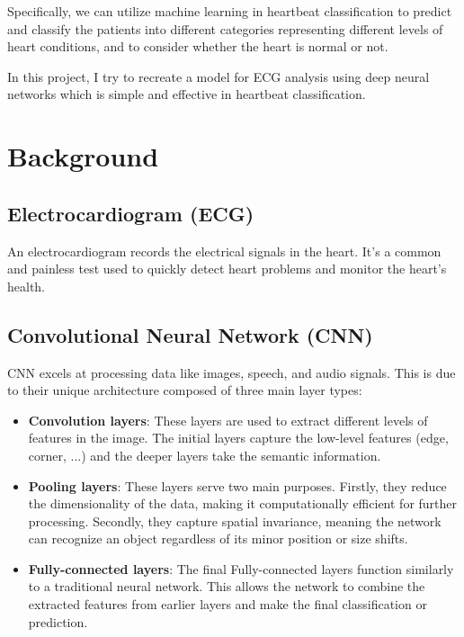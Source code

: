 \documentclass[conference]{IEEEtran}
\begin{document}
Specifically, we can utilize machine learning in heartbeat classification to predict and classify the patients into different categories representing different levels of heart conditions, and to consider whether the heart is normal or not. 


In this project, I try to recreate a model for ECG analysis using deep neural networks which is simple and effective in heartbeat classification.

\section{Background}
\subsection{Electrocardiogram (ECG)} An electrocardiogram records the electrical signals in the heart. It's a common and painless test used to quickly detect heart problems and monitor the heart's health.
\subsection{Convolutional Neural Network (CNN)} CNN excels at processing data like images, speech, and audio signals. This is due to their unique architecture composed of three main layer types:
\begin{itemize}
    \item \textbf{Convolution layers}: These layers are used to extract different levels of features in the image. The initial layers capture the low-level features (edge, corner, ...) and the deeper layers take the semantic information. \\
    \item \textbf{Pooling layers}: These layers serve two main purposes. Firstly, they reduce the dimensionality of the data, making it computationally efficient for further processing. Secondly, they capture spatial invariance, meaning the network can recognize an object regardless of its minor position or size shifts.\\
    \item \textbf{Fully-connected layers}: The final Fully-connected layers function similarly to a traditional neural network. This allows the network to combine the extracted features from earlier layers and make the final classification or prediction.
\end{itemize}
\end{document}
